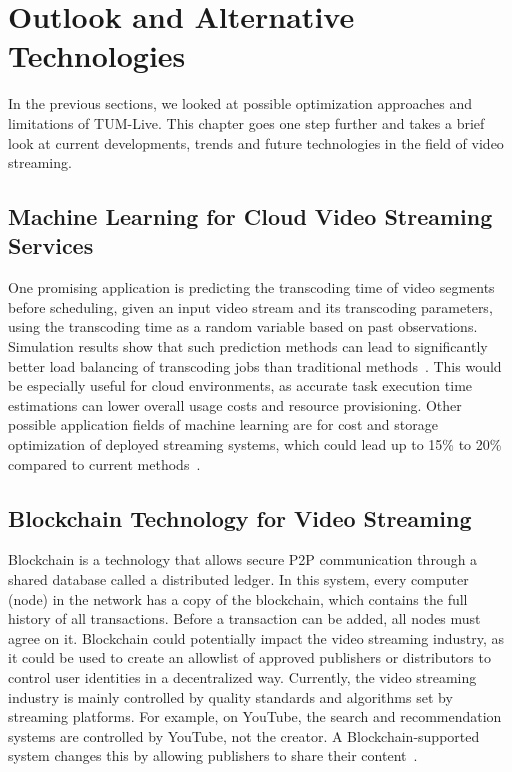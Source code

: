 
\chapter{Outlook and Alternative Technologies}\label{chapter:outlook}

In the previous sections, we looked at possible optimization approaches and limitations of TUM-Live. This chapter goes one step further and takes a brief look at current developments, trends and future technologies in the field of video streaming.

\section{Machine Learning for Cloud Video Streaming Services}

One promising application is predicting the transcoding time of video segments before scheduling, given an input video stream and its transcoding parameters, using the transcoding time as a random variable based on past observations. Simulation results show that such prediction methods can lead to significantly better load balancing of transcoding jobs than traditional methods~\parencite{cloud_predicting}.
This would be especially useful for cloud environments, as accurate task execution time estimations can lower overall usage costs and resource provisioning. Other possible application fields of machine learning are for cost and storage optimization of deployed streaming systems, which could lead up to 15\% to 20\% compared to current methods~\parencite{deep_learning_cloud}.

\section{Blockchain Technology for Video Streaming}

Blockchain is a technology that allows secure \ac{P2P} communication through a shared database called a distributed ledger. In this system, every computer (node) in the network has a copy of the blockchain, which contains the full history of all transactions. Before a transaction can be added, all nodes must agree on it.
Blockchain could potentially impact the video streaming industry, as it could be used to create an allowlist of approved publishers or distributors to control user identities in a decentralized way.
Currently, the video streaming industry is mainly controlled by quality standards and algorithms set by streaming platforms. For example, on YouTube, the search and recommendation systems are controlled by YouTube, not the creator. A Blockchain-supported system changes this by allowing publishers to share their content~\parencite{cloud_streaming}.

